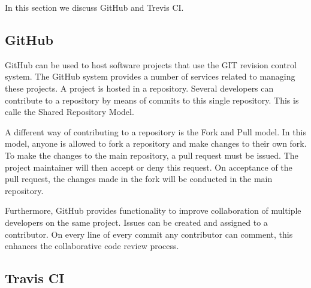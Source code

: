 In this section we discuss GitHub and Trevis CI.

\subsection{GitHub}
GitHub can be used to host software projects that use the GIT revision control system. 
The GitHub system provides a number of services related to managing these projects. 
A project is hosted in a repository. 
Several developers can contribute to a repository by means of commits to this single repository.
This is calle the Shared Repository Model.
 
A different way of contributing to a repository is the Fork and Pull model.
In this model, anyone is allowed to fork a repository and make changes to their own fork.
To make the changes to the main repository, a pull request must be issued.
The project maintainer will then accept or deny this request.
On acceptance of the pull request, the changes made in the fork will be conducted in the main repository.

Furthermore, GitHub provides functionality to improve collaboration of multiple developers on the same project.
Issues can be created and assigned to a contributor. 
On every line of every commit any contributor can comment, this enhances the collaborative code review process.

\subsection{Travis CI}
